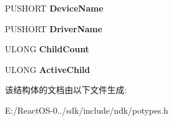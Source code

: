 \begin{DoxyCompactItemize}
P\+U\+S\+H\+O\+RT {\bfseries Device\+Name}
\item 
\mbox{\label{struct___p_o___d_e_v_i_c_e___n_o_t_i_f_y_ae593fc1718d1926e9df94ad59899b12e}} 
P\+U\+S\+H\+O\+RT {\bfseries Driver\+Name}
\item 
\mbox{\label{struct___p_o___d_e_v_i_c_e___n_o_t_i_f_y_a8e0f3f28b0143e8cfbf4692f9a68ca3a}} 
U\+L\+O\+NG {\bfseries Child\+Count}
\item 
\mbox{\label{struct___p_o___d_e_v_i_c_e___n_o_t_i_f_y_a5b70cc91c08208eef2345edec1500af1}} 
U\+L\+O\+NG {\bfseries Active\+Child}
\end{DoxyCompactItemize}


该结构体的文档由以下文件生成\+:\begin{DoxyCompactItemize}
\item 
E\+:/\+React\+O\+S-\/0../sdk/include/ndk/potypes.\+h\end{DoxyCompactItemize}
